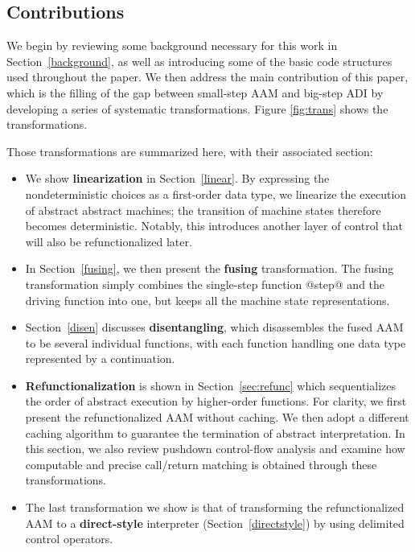 \documentclass[acmsmall, review]{acmart}\settopmatter{}
\begin{document}
\subsection{Contributions}

We begin by reviewing some background necessary for this work in Section~\ref{background}, 
as well as introducing some of the basic code structures used throughout the paper. 
We then address the main contribution of this paper, which is the filling of the gap between
small-step AAM and big-step ADI by developing a series of systematic transformations. 
Figure \ref{fig:trans} shows the transformations.

Those transformations are summarized here, with their associated section:

\begin{itemize}
  \item We show \textbf{linearization} in Section~\ref{linear}. By expressing the
    nondeterministic choices as a first-order data type, we linearize the execution
    of abstract abstract machines; the transition of machine states therefore becomes 
    deterministic. Notably, this introduces another layer of control that will also 
    be refunctionalized later.

  \item In Section~\ref{fusing}, we then present the \textbf{fusing} transformation.
    The fusing transformation simply combines the single-step function @step@ and the 
    driving function into one, but keeps all the machine state representations.

  \item Section~\ref{disen} discusses \textbf{disentangling}, which disassembles the 
    fused AAM to be several individual functions, with each function handling one data 
    type represented by a continuation.

  \item \textbf{Refunctionalization} is shown in Section~\ref{sec:refunc} which sequentializes
    the order of abstract execution by higher-order functions. For clarity, we first present 
    the refunctionalized AAM without caching. We then adopt a different caching algorithm to 
    guarantee the termination of abstract interpretation.
    In this section, we also review pushdown control-flow analysis and examine how computable
    and precise call/return matching is obtained through these transformations.

  \item The last transformation we show is that of transforming the refunctionalized AAM to a
    \textbf{direct-style} interpreter (Section~\ref{directstyle}) by using delimited control operators.
\end{itemize}
\end{document}
